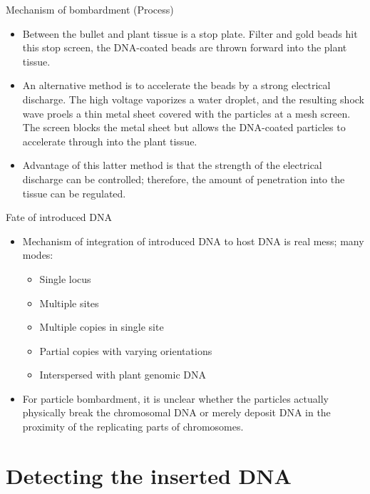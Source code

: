\documentclass[
  ignorenonframetext,
  aspectratio=169]{beamer}
\providecommand{\tightlist}{%
  \setlength{\itemsep}{0pt}\setlength{\parskip}{0pt}}
\begin{document}
\begin{frame}{Mechanism of bombardment (Process)}
\protect\hypertarget{mechanism-of-bombardment-process-1}{}
\begin{itemize}
\tightlist
\item
  Between the bullet and plant tissue is a stop plate. Filter and gold
  beads hit this stop screen, the DNA-coated beads are thrown forward
  into the plant tissue.
\item
  An alternative method is to accelerate the beads by a strong
  electrical discharge. The high voltage vaporizes a water droplet, and
  the resulting shock wave proels a thin metal sheet covered with the
  particles at a mesh screen. The screen blocks the metal sheet but
  allows the DNA-coated particles to accelerate through into the plant
  tissue.
\item
  Advantage of this latter method is that the strength of the electrical
  discharge can be controlled; therefore, the amount of penetration into
  the tissue can be regulated.
\end{itemize}
\end{frame}

\begin{frame}{Fate of introduced DNA}
\protect\hypertarget{fate-of-introduced-dna}{}
\begin{itemize}
\tightlist
\item
  Mechanism of integration of introduced DNA to host DNA is real mess;
  many modes:

  \begin{itemize}
  \tightlist
  \item
    Single locus
  \item
    Multiple sites
  \item
    Multiple copies in single site
  \item
    Partial copies with varying orientations
  \item
    Interspersed with plant genomic DNA
  \end{itemize}
\item
  For particle bombardment, it is unclear whether the particles actually
  physically break the chromosomal DNA or merely deposit DNA in the
  proximity of the replicating parts of chromosomes.
\end{itemize}
\end{frame}

\hypertarget{detecting-the-inserted-dna}{%
\section{Detecting the inserted DNA}\label{detecting-the-inserted-dna}}
\end{document}
